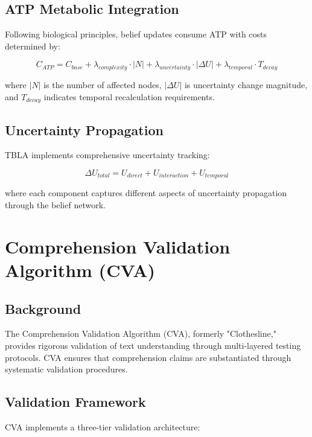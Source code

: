 \documentclass[12pt,a4paper]{article}
\begin{document}
\subsection{ATP Metabolic Integration}

Following biological principles, belief updates consume ATP with costs determined by:

\begin{equation}
C_{ATP} = C_{base} + \lambda_{complexity} \cdot |N| + \lambda_{uncertainty} \cdot |\Delta U| + \lambda_{temporal} \cdot T_{decay}
\end{equation}

where $|N|$ is the number of affected nodes, $|\Delta U|$ is uncertainty change magnitude, and $T_{decay}$ indicates temporal recalculation requirements.

\subsection{Uncertainty Propagation}

TBLA implements comprehensive uncertainty tracking:

\begin{equation}
\Delta U_{total} = U_{direct} + U_{interaction} + U_{temporal}
\end{equation}

where each component captures different aspects of uncertainty propagation through the belief network.

\section{Comprehension Validation Algorithm (CVA)}

\subsection{Background}

The Comprehension Validation Algorithm (CVA), formerly "Clothesline," provides rigorous validation of text understanding through multi-layered testing protocols. CVA ensures that comprehension claims are substantiated through systematic validation procedures.

\subsection{Validation Framework}

CVA implements a three-tier validation architecture:
\end{document}
